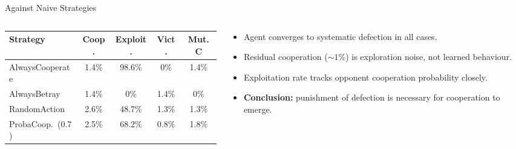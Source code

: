 \documentclass[10pt, aspectratio=169]{beamer}
\begin{document}
\begin{frame}{Against Naive Strategies}
  \begin{columns}[T]
    \begin{column}{0.52\textwidth}
      \centering
      \begin{tabular}{lcccc}
        \toprule
        Strategy & Coop. & Exploit. & Vict. & Mut.C \\
        \midrule
        AlwaysCooperate      & 1.4\%  & 98.6\% & 0\%   & 1.4\%  \\
        AlwaysBetray         & 1.4\%  & 0\%    & 1.4\% & 0\%    \\
        RandomAction         & 2.6\%  & 48.7\% & 1.3\% & 1.3\%  \\
        ProbaCoop.\ (0.7)    & 2.5\%  & 68.2\% & 0.8\% & 1.8\%  \\
        \bottomrule
      \end{tabular}
    \end{column}
    \begin{column}{0.44\textwidth}
      \begin{itemize}
        \item Agent converges to \alert{systematic defection} in all cases.
        \item Residual cooperation (\(\sim\!1\%\)) is exploration noise, not learned behaviour.
        \item Exploitation rate tracks opponent cooperation probability closely.
        \item \textbf{Conclusion:} punishment of defection is necessary for cooperation to emerge.
      \end{itemize}
    \end{column}
  \end{columns}
\end{frame}
\end{document}
